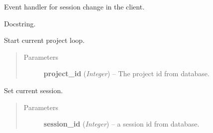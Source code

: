 \documentclass[letterpaper,10pt,english]{sphinxmanual}
\begin{document}
\begin{fulllineitems}
\begin{fulllineitems}
\end{fulllineitems}


\begin{fulllineitems}
\label{state:state.State.on_session_changed}
Event handler for session change in the client.

\end{fulllineitems}


\begin{fulllineitems}
\label{state:state.State.remove_observer}
Docstring.

\end{fulllineitems}


\begin{fulllineitems}
\label{state:state.State.set_current_project}
Start current project loop.
\begin{quote}\begin{description}
\item[{Parameters}] \leavevmode
\textbf{project\_id} (\emph{Integer}) -- The project id from database.

\end{description}\end{quote}

\end{fulllineitems}


\begin{fulllineitems}
\label{state:state.State.set_current_session}
Set current session.
\begin{quote}\begin{description}
\item[{Parameters}] \leavevmode
\textbf{session\_id} (\emph{Integer}) -- a session id from database.

\end{description}\end{quote}


\end{fulllineitems}
\end{fulllineitems}
\end{document}
